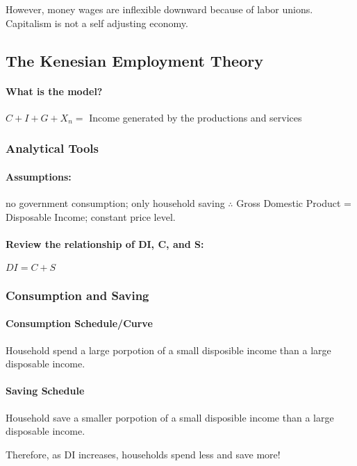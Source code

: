 	However, money wages are inflexible downward because of labor unions.
	Capitalism is not a self adjusting economy.

\subsection{The Kenesian Employment Theory}

\paragraph{What is the model?}

$C + I + G + X_n =$ Income generated by the productions and services

\subsubsection{Analytical Tools}

\paragraph{Assumptions:} no government consumption; only household saving $\therefore$ Gross Domestic Product = Disposable Income; constant price level.

\paragraph{Review the relationship of DI, C, and S:}
$
	DI = C  + S
$

\subsubsection{Consumption and Saving}

\paragraph{Consumption Schedule/Curve} Household spend a large porpotion of a small disposible income than a large disposable income.

\paragraph{Saving Schedule} Household save a smaller porpotion of a small disposible income than a large disposable income.

Therefore, as DI increases, households spend less and save more!

